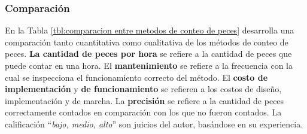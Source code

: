 \subsubsection{Comparación}

En la Tabla \ref{tbl:comparacion entre metodos de conteo de peces} desarrolla una comparación tanto cuantitativa como cualitativa de los métodos de conteo de peces. \textbf{La cantidad de peces por hora} se refiere a la cantidad de peces que puede contar en una hora. El \textbf{mantenimiento} se refiere a la frecuencia con la cual se inspecciona el funcionamiento correcto del método. El \textbf{costo de implementación} y \textbf{de funcionamiento} se refieren a los costos de diseño, implementación y de marcha. La \textbf{precisión} se refiere a la cantidad de peces correctamente contados en comparación con los que no fueron contados. La calificación “\textit{bajo, medio, alto}” son juicios del autor, basándose en su experiencia.


